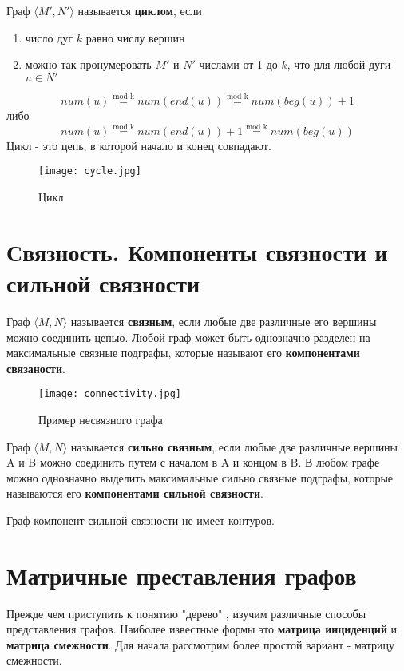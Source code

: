 \vspace{3mm}

Граф $\langle M', N'\rangle$ называется \textbf{циклом}, если
\begin{enumerate}
    \item число дуг $k$ равно числу вершин
    \item можно так пронумеровать $M'$ и $N'$ числами от 1 до $k$, что для любой дуги $u \in N'$
\end{enumerate}
\begin{equation}
    num(u) \stackrel{\text{mod k}}{=} num(end(u)) \stackrel{\text{mod k}}{=} num(beg(u)) + 1
\end{equation}
либо
\begin{equation}
    num(u) \stackrel{\text{mod k}}{=} num(end(u)) + 1 \stackrel{\text{mod k}}{=} num(beg(u))
\end{equation}
Цикл - это цепь, в которой начало и конец совпадают.
\begin{figure}[h]
    \centering 
    \texttt{[image: cycle.jpg]}
    \caption{Цикл}
\end{figure}

\section{Связность. Компоненты связности и сильной связности}
Граф $\langle M, N\rangle$ называется \textbf{связным}, если любые две различные его
вершины можно соединить цепью. Любой граф может быть однозначно разделен на максимальные
связные подграфы, которые называют его \textbf{компонентами связаности}.
\begin{figure}[h]
    \centering 
    \texttt{[image: connectivity.jpg]}
    \caption{Пример несвязного графа}
\end{figure}

Граф $\langle M, N\rangle$ называется \textbf{сильно связным}, если любые две различные
вершины A и B можно соединить путем с началом в A и концом в B. В любом графе можно однозначно
выделить максимальные сильно связные подграфы, которые называются его \textbf{компонентами сильной связности}.
\begin{thm}
    Граф компонент сильной связности не имеет контуров.
\end{thm}

\section{Матричные преставления графов}
Прежде чем приступить к понятию "дерево" , изучим различные способы представления графов.
Наиболее известные формы это \textbf{матрица инциденций} и \textbf{матрица смежности}.
Для начала рассмотрим более простой вариант - матрицу смежности.

